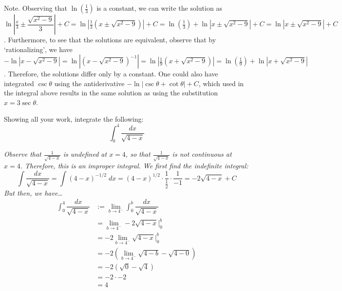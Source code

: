 \documentclass[12pt,letterpaper]{exam}
\begin{document}
\begin{questions}
{\vfill {\tiny Note. Observing that $\ln(\frac{1}{3})$ is a constant, we can write the solution as $\ln\left| \frac{x}{3} \pm \dfrac{\sqrt{x^2 - 9}}{3} \right| + C= \ln\left| \frac{1}{3} \left( x \pm \sqrt{x^2 - 9} \right) \right| + C= \ln(\frac{1}{3}) + \ln\left| x \pm \sqrt{x^2 - 9} \right| + C= \ln\left| x \pm \sqrt{x^2 - 9} \right| + C$. Furthermore, to see that the solutions are equivalent, observe that by `rationalizing', we have $-\ln|x - \sqrt{x^2 - 9}|= \ln| (x - \sqrt{x^2 - 9})^{-1}|= \ln| \frac{1}{9} (x + \sqrt{x^2 - 9})|= \ln(\frac{1}{9}) + \ln| x + \sqrt{x^2 - 9}|$. Therefore, the solutions differ only by a constant. One could also have integrated $\csc \theta$ using the antiderivative $-\ln| \csc \theta + \cot \theta| + C$, which used in the integral above results in the same solution as using the substitution $x= 3 \sec \theta$.}
}



\newpage
\question[10] Showing all your work, integrate the following:
	\[
	\int_0^4 \dfrac{dx}{\sqrt{4 - x}}
	\] \pspace

{\itshape \tsol Observe that $\frac{1}{\sqrt{4 - x}}$ is undefined at $x= 4$, so that $\frac{1}{\sqrt{4 - x}}$ is not continuous at $x= 4$. Therefore, this is an improper integral. We first find the indefinite integral:
	\[
	\int \dfrac{dx}{\sqrt{4 - x}}= \int (4 - x)^{-1/2} \;dx= (4 - x)^{1/2} \cdot \dfrac{1}{\frac{1}{2}} \cdot \dfrac{1}{-1}= -2 \sqrt{4 - x} + C
	\]
But then, we have\dots
	\[
	\begin{aligned}
	\int_0^4 \dfrac{dx}{\sqrt{4 - x}}&:= \lim_{b \to 4^-} \int_0^b \dfrac{dx}{\sqrt{4 - x}} \\[0.3cm]
	&= \lim_{b \to 4^-} -2 \sqrt{4 - x} \bigg|_{0}^b \\[0.3cm]
	&= -2 \lim_{b \to 4^-} \sqrt{4 - x} \bigg|_{0}^b \\[0.3cm]
	&= -2 \left( \lim_{b \to 4^-} \sqrt{4 - b} - \sqrt{4 - 0} \right) \\[0.3cm]
	&= -2 \left( \sqrt{0} - \sqrt{4} \right) \\[0.3cm]
	&= -2 \cdot -2 \\[0.3cm]
	&= 4
	\end{aligned}
	\] \vfill

}
\end{questions}
\end{document}
